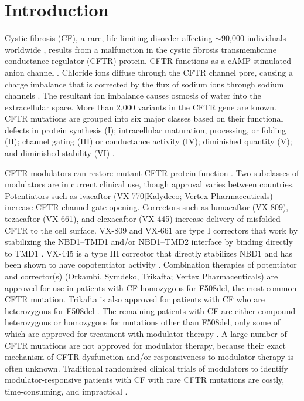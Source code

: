 \section{Introduction}
Cystic fibrosis (CF), a rare, life-limiting disorder affecting $\sim$90,000 individuals worldwide \cite{rasaruseckaite2017}, results from a malfunction in the cystic fibrosis transmembrane conductance regulator (CFTR) protein. CFTR functions as a cAMP-stimulated anion channel \cite{saint-criq2017}. Chloride ions diffuse through the CFTR channel pore, causing a charge imbalance that is corrected by the flux of sodium ions through sodium channels \cite{saint-criq2017}. The resultant ion imbalance causes osmosis of water into the extracellular space. More than 2,000 variants in the CFTR gene are known. CFTR mutations are grouped into six major classes based on their functional defects in protein synthesis (I); intracellular maturation, processing, or folding (II); channel gating (III) or conductance activity (IV); diminished quantity (V); and diminished stability (VI) \cite{marson2016}.

CFTR modulators can restore mutant CFTR protein function \cite{clancy2019}. Two subclasses of modulators are in current clinical use, though approval varies between countries. Potentiators such as ivacaftor (VX-770|Kalydeco; Vertex Pharmaceuticals) increase CFTR channel gate opening. Correctors such as lumacaftor (VX-809), tezacaftor (VX-661), and elexacaftor (VX-445) increase delivery of misfolded CFTR to the cell surface. VX-809 and VX-661 are type I correctors that work by stabilizing the NBD1–TMD1 and/or NBD1–TMD2 interface by binding directly to TMD1 \cite{loo2013, ren2013}. VX-445 is a type III corrector that directly stabilizes NBD1 and has been shown to have copotentiator activity \cite{shaughnessy2021, laselva2021, veit2021a, okiyoneda2013}. Combination therapies of potentiator and corrector(s) (Orkambi, Symdeko, Trikafta; Vertex Pharmaceuticals) are approved for use in patients with CF homozygous for F508del, the most common CFTR mutation\cite{commissioner2020, fda_symdeko_approval, fda_orkambi_approval}. Trikafta is also approved for patients with CF who are heterozygous for F508del \cite{commissioner2020}. The remaining patients with CF are either compound heterozygous or homozygous for mutations other than F508del, only some of which are approved for treatment with modulator therapy \cite{fda_expansion_rare_mutations}. A large number of CFTR mutations are not approved for modulator therapy, because their exact mechanism of CFTR dysfunction and/or responsiveness to modulator therapy is often unknown. Traditional randomized clinical trials of modulators to identify modulator-responsive patients with CF with rare CFTR mutations are costly, time-consuming, and impractical \cite{bell2020}.

